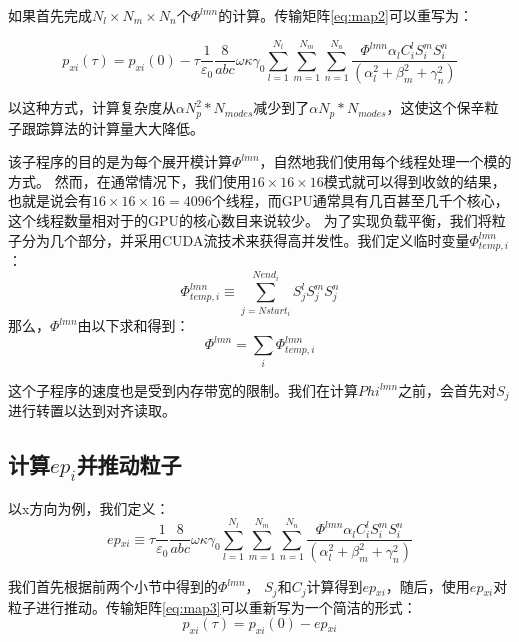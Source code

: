 如果首先完成${{N}_{l}}\times{{N}_{m}}\times{{N}_{n}}$个$\Phi^{lmn}$的计算。传输矩阵\ref{eq:map2}可以重写为：

\begin{equation}\label{eq:map3}
{{p}_{xi}}(\tau )={{p}_{xi}}(0)-\tau \frac{1}{{{\varepsilon }_{0}}}\frac{8}{abc}\omega \kappa {{\gamma }_{0}}\sum\limits_{l=1}^{{{N}_{l}}}{\sum\limits_{m=1}^{{{N}_{m}}}{\sum\limits_{n=1}^{{{N}_{n}}}{\frac{\Phi^{lmn}{{\alpha }_{l}}C_{i}^{l}S_{i}^{m}S_{i}^{n}}{(\alpha _{l}^{2}+\beta _{m}^{2}+\gamma _{n}^{2})}}}}
\end{equation}

以这种方式，计算复杂度从$\alpha N_p^2*N_{modes}$减少到了$\alpha  N_p*N_{modes}$，这使这个保辛粒子跟踪算法的计算量大大降低。

该子程序的目的是为每个展开模计算$\Phi^{lmn}$，自然地我们使用每个线程处理一个模的方式。
然而，在通常情况下，我们使用$16\times 16\times 16$模式就可以得到收敛的结果，也就是说会有$16\times 16\times 16 = 4096$个线程，而GPU通常具有几百甚至几千个核心，这个线程数量相对于的GPU的核心数目来说较少。
为了实现负载平衡，我们将粒子分为几个部分，并采用CUDA流技术来获得高并发性。我们定义临时变量$\Phi^{lmn}_{temp,i}$：
\begin{equation}
\Phi^{lmn}_{temp,i}\equiv \sum\limits_{j=Nstar{{t}_{i}}}^{Nen{{d}_{i}}}{S_{j}^{l}S_{j}^{m}S_{j}^{n}}
\end{equation}
那么，$\Phi^{lmn}$由以下求和得到：
\begin{equation}
\Phi^{lmn}=\sum\limits_{i}{\Phi^{lmn}_{temp,i}}
\end{equation}

这个子程序的速度也是受到内存带宽的限制。我们在计算$Phi^{lmn}$之前，会首先对$S_{j}$进行转置以达到对齐读取。

\subsection{计算$ep_i$并推动粒子}
以x方向为例，我们定义：
\begin{equation}
ep{_{xi}}\equiv \tau \frac{1}{{{\varepsilon }_{0}}}\frac{8}{abc}\omega \kappa {{\gamma }_{0}}\sum\limits_{l=1}^{{{N}_{l}}}{\sum\limits_{m=1}^{{{N}_{m}}}{\sum\limits_{n=1}^{{{N}_{n}}}{\frac{\Phi^{lmn}{{\alpha }_{l}}C_{i}^{l}S_{i}^{m}S_{i}^{n}}{(\alpha _{l}^{2}+\beta _{m}^{2}+\gamma _{n}^{2})}}}}
\end{equation}

我们首先根据前两个小节中得到的$\Phi^{lmn}$， $S_{j}^{{}}$和$C_{j}^{{}}$计算得到$ep{_{xi}}$，随后，使用$ep{_{xi}}$对粒子进行推动。传输矩阵\ref{eq:map3}可以重新写为一个简洁的形式：
\begin{equation}\label{eq:map4}
{{p}_{xi}}(\tau )={{p}_{xi}}(0)-ep{_{xi}}
\end{equation}


